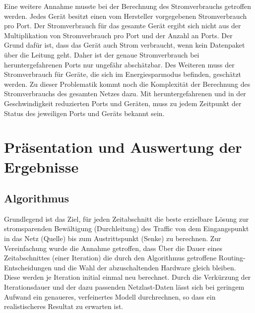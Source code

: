 \documentclass[12pt,titlepage]{article}
\begin{document}
Eine weitere Annahme musste bei der Berechnung des Stromverbrauchs getroffen werden. Jedes Gerät besitzt einen vom Hersteller vorgegebenen Stromverbrauch pro Port. Der Stromverbrauch für das gesamte Gerät ergibt sich nicht aus der Multiplikation von Stromverbrauch pro Port und der Anzahl an Ports. Der Grund dafür ist, dass das Gerät auch Strom verbraucht, wenn kein Datenpaket über die Leitung geht. Daher ist der genaue Stromverbrauch bei heruntergefahrenen Ports nur ungefähr abschätzbar. Des Weiteren  muss der Stromverbrauch für Geräte, die sich im Energiesparmodus befinden, geschätzt werden. Zu dieser Problematik kommt noch die Komplexität der Berechnung des Stromverbrauchs des gesamten Netzes dazu. Mit heruntergefahrenen und in der Geschwindigkeit reduzierten Ports und Geräten, muss zu jedem Zeitpunkt der Status des jeweiligen Ports und Geräts bekannt sein.  

\section{Präsentation und Auswertung der Ergebnisse} \label{Ergebnisse}
\subsection{Algorithmus} \label{subsec:ErgAlg}
Grundlegend ist das Ziel, für jeden Zeitabschnitt die beste erzielbare Lösung zur stromsparenden Bewältigung (Durchleitung) des Traffic von dem Eingangspunkt in das Netz (Quelle) bis zum Austrittspunkt (Senke) zu berechnen. Zur Vereinfachung wurde die Annahme getroffen, dass Über die Dauer eines Zeitabschnittes (einer Iteration) die durch den Algorithmus getroffene Routing-Entscheidungen und die Wahl der abzuschaltenden Hardware gleich bleiben. Diese werden je Iteration initial einmal neu berechnet. Durch die Verkürzung der Iterationsdauer und der dazu passenden Netzlast-Daten lässt sich bei geringem Aufwand ein genaueres, verfeinertes Modell durchrechnen, so dass ein realistischeres Resultat zu erwarten ist.
\end{document}
